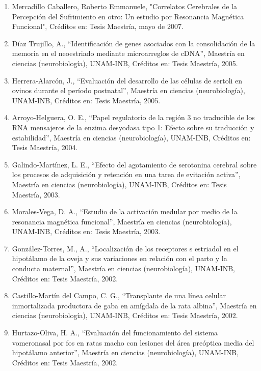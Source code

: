 \documentclass[12pt]{article}
\begin{document}
\begin{enumerate}
\item Mercadillo Caballero, Roberto Emmanuele, "Correlatos Cerebrales de la Percepción del Sufrimiento en otro: Un estudio por 
Resonancia 
Magnética Funcional", Créditos en: Tesis Maestría, mayo de 2007.

\item Díaz Trujillo, A., “Identificación de genes asociados con la consolidación de la memoria en el neoestriado mediante microarreglos 
de cDNA”, Maestría en ciencias (neurobiología), UNAM-INB, Créditos en: Tesis Maestría, 2005.

\item Herrera-Alarcón, J., “Evaluación del desarrollo de las células de sertoli en ovinos durante el período postnatal”, Maestría en 
ciencias (neurobiología), UNAM-INB, Créditos en: Tesis Maestría, 2005.

\item Arroyo-Helguera, O. E., “Papel regulatorio de la región 3 no traducible de los RNA mensajeros de la enzima desyodasa tipo 1: 
Efecto 
sobre su traducción y estabilidad”, Maestría en ciencias (neurobiología), UNAM-INB, Créditos en: Tesis Maestría, 2004.

\item Galindo-Martínez, L. E., “Efecto del agotamiento de serotonina cerebral sobre los procesos de adquisición y retención en una 
tarea 
de evitación activa”, Maestría en ciencias (neurobiología), UNAM-INB, Créditos en: Tesis Maestría, 2003.

\item Morales-Vega, D. A., “Estudio de la activación medular por medio de la resonancia magnética funcional”, Maestría en ciencias 
(neurobiología), UNAM-INB, Créditos en: Tesis Maestría, 2003.

\item González-Torres, M., A., “Localización de los receptores s estriadol en el hipotálamo de la oveja y sus variaciones en relación 
con 
el parto y la conducta maternal”, Maestría en ciencias (neurobiología), UNAM-INB, Créditos en: Tesis Maestría, 2002.

\item Castillo-Martín del Campo, C. G., “Transplante de una línea celular inmortalizada productora de gaba en amígdala de la rata 
albina”, Maestría en ciencias (neurobiología), UNAM-INB, Créditos en: Tesis Maestría, 2002.

\item Hurtazo-Oliva, H. A., “Evaluación del funcionamiento del sistema vomeronasal por fos en ratas macho con lesiones del área 
preóptica 
media del hipotálamo anterior”, Maestría en ciencias (neurobiología), UNAM-INB, Créditos en: Tesis Maestría, 2002.


\end{enumerate}
\end{document}
